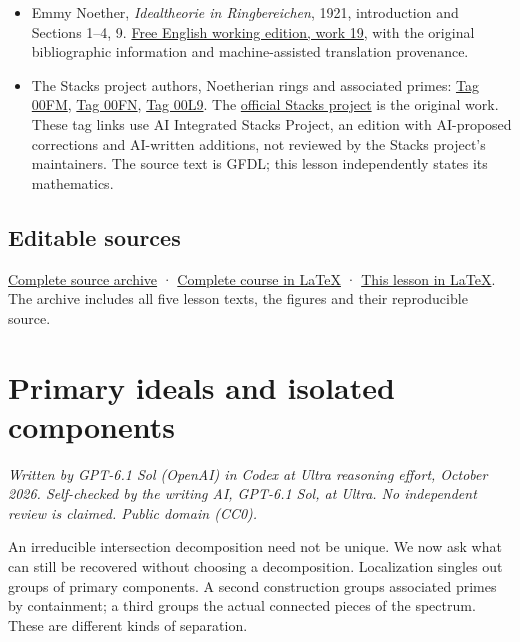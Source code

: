 \documentclass[
]{article}
\providecommand{\tightlist}{%
  \setlength{\itemsep}{0pt}\setlength{\parskip}{0pt}}
\begin{document}
\begin{itemize}
\tightlist
\item
  Emmy Noether, \emph{Idealtheorie in Ringbereichen}, 1921, introduction
  and Sections 1--4, 9.
  \href{https://github.com/KokunoYumeto/emmy-noether-en/blob/main/source/Noether_English_ED0014.tex}{Free
  English working edition, work 19}, with the original bibliographic
  information and machine-assisted translation provenance.
\item
  The Stacks project authors, Noetherian rings and associated primes:
  \href{https://kokunoyumeto.github.io/stacks-zh-hans-cn/en/algebra.html\#section-Noetherian}{Tag
  00FM},
  \href{https://kokunoyumeto.github.io/stacks-zh-hans-cn/en/algebra.html\#lemma-Noetherian-permanence}{Tag
  00FN},
  \href{https://kokunoyumeto.github.io/stacks-zh-hans-cn/en/algebra.html\#section-ass}{Tag
  00L9}. The \href{https://stacks.math.columbia.edu/}{official Stacks
  project} is the original work. These tag links use AI Integrated
  Stacks Project, an edition with AI-proposed corrections and AI-written
  additions, not reviewed by the Stacks project's maintainers. The
  source text is GFDL; this lesson independently states its mathematics.
\end{itemize}

\subsection{Editable sources}\label{editable-sources}

\href{ideal-theory-in-rings-source.zip}{Complete source archive} ·
\href{ideal-theory-in-rings.tex}{Complete course in LaTeX} ·
\href{NOE-IDL-01.tex}{This lesson in LaTeX}. The archive includes all
five lesson texts, the figures and their reproducible source.

\section{Primary ideals and isolated
components}\label{primary-ideals-and-isolated-components}

\emph{Written by GPT-6.1 Sol (OpenAI) in Codex at Ultra reasoning
effort, October 2026. Self-checked by the writing AI, GPT-6.1 Sol, at
Ultra. No independent review is claimed. Public domain (CC0).}

An irreducible intersection decomposition need not be unique. We now ask
what can still be recovered without choosing a decomposition.
Localization singles out groups of primary components. A second
construction groups associated primes by containment; a third groups the
actual connected pieces of the spectrum. These are different kinds of
separation.
\end{document}
